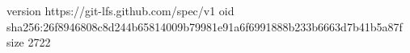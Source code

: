 version https://git-lfs.github.com/spec/v1
oid sha256:26f8946808c8d244b65814009b79981e91a6f6991888b233b6663d7b41b5a87f
size 2722

